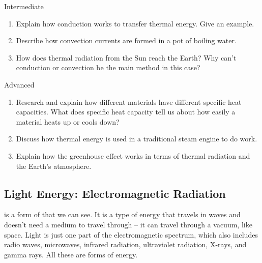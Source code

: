 \begin{tieredquestions}{Intermediate}
\begin{enumerate}
    \item Explain how conduction works to transfer thermal energy. Give an example.
    \item Describe how convection currents are formed in a pot of boiling water.
    \item How does thermal radiation from the Sun reach the Earth? Why can't conduction or convection be the main method in this case?
\end{enumerate}
\end{tieredquestions}

\begin{tieredquestions}{Advanced}
\begin{enumerate}
    \item Research and explain how different materials have different specific heat capacities. What does specific heat capacity tell us about how easily a material heats up or cools down?
    \item Discuss how thermal energy is used in a traditional steam engine to do work.
    \item  Explain how the greenhouse effect works in terms of thermal radiation and the Earth's atmosphere.
\end{enumerate}
\end{tieredquestions}


\subsection{Light Energy: Electromagnetic Radiation}

 is a form of  that we can see.  It is a type of energy that travels in waves and doesn't need a medium to travel through – it can travel through a vacuum, like space.  Light is just one part of the electromagnetic spectrum, which also includes radio waves, microwaves, infrared radiation, ultraviolet radiation, X-rays, and gamma rays. All these are forms of energy.


